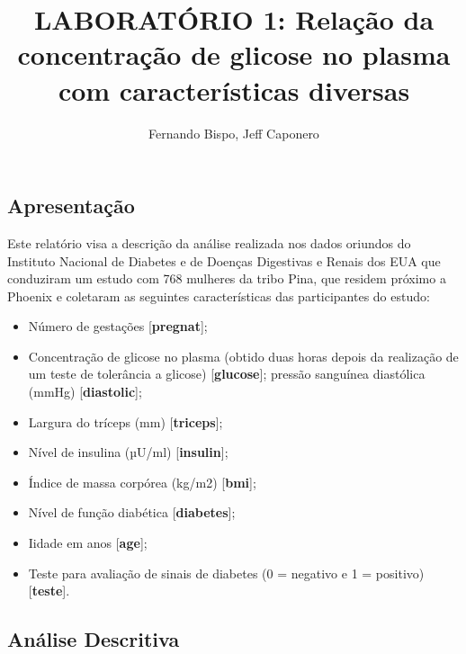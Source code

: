 \documentclass[
  letterpaper,
  DIV=11,
  numbers=noendperiod]{scrartcl}
\title{LABORATÓRIO 1: Relação da concentração de glicose no plasma com
características diversas}
\author{Fernando Bispo, Jeff Caponero}
\date{}
\providecommand{\tightlist}{%
  \setlength{\itemsep}{0pt}\setlength{\parskip}{0pt}}\usepackage{longtable,booktabs,array}
\renewcommand*\contentsname{Table of contents}
\newcommand\contentsname{Table of contents}
\begin{document}
\maketitle
\ifdefined\Shaded\renewenvironment{Shaded}{\begin{tcolorbox}[borderline west={3pt}{0pt}{shadecolor}, breakable, interior hidden, frame hidden, boxrule=0pt, sharp corners, enhanced]}{\end{tcolorbox}}\fi

\renewcommand*\contentsname{Table of contents}
{
\hypersetup{linkcolor=}
\setcounter{tocdepth}{3}
\tableofcontents
}
\hypertarget{apresentauxe7uxe3o}{%
\subsection{Apresentação}\label{apresentauxe7uxe3o}}

Este relatório visa a descrição da análise realizada nos dados oriundos
do Instituto Nacional de Diabetes e de Doenças Digestivas e Renais dos
EUA que conduziram um estudo com 768 mulheres da tribo Pina, que residem
próximo a Phoenix e coletaram as seguintes características das
participantes do estudo:

\begin{itemize}
\tightlist
\item
  Número de gestações {[}\textbf{pregnat}{]};
\item
  Concentração de glicose no plasma (obtido duas horas depois da
  realização de um teste de tolerância a glicose)
  {[}\textbf{glucose}{]}; pressão sanguínea diastólica (mmHg)
  {[}\textbf{diastolic}{]};
\item
  Largura do tríceps (mm) {[}\textbf{triceps}{]};
\item
  Nível de insulina (µU/ml) {[}\textbf{insulin}{]};
\item
  Índice de massa corpórea (kg/m2) {[}\textbf{bmi}{]};
\item
  Nível de função diabética {[}\textbf{diabetes}{]};
\item
  Iidade em anos {[}\textbf{age}{]};
\item
  Teste para avaliação de sinais de diabetes (0 = negativo e 1 =
  positivo) {[}\textbf{teste}{]}.
\end{itemize}

\hypertarget{anuxe1lise-descritiva}{%
\subsection{Análise Descritiva}\label{anuxe1lise-descritiva}}
\end{document}
